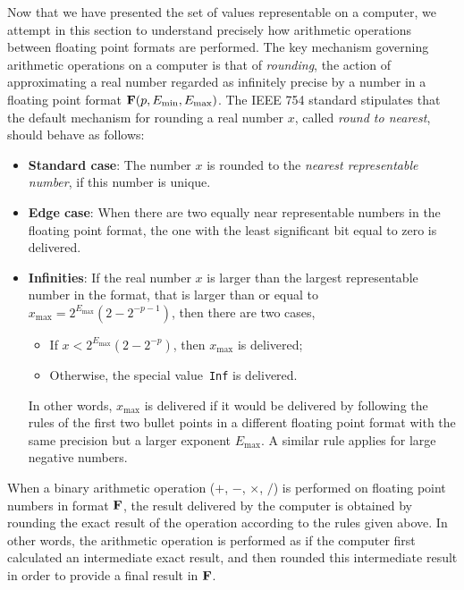Now that we have presented the set of values representable on a computer,
we attempt in this section to understand precisely how arithmetic operations between floating point formats are performed.
The key mechanism governing arithmetic operations on a computer is that of \emph{rounding},
the action of approximating a real number regarded as infinitely precise by a number in a floating point format $\mathbf F (p, E_{\min}, E_{\max})$.
The IEEE 754 standard stipulates that the default mechanism for rounding a real number $x$,
called \emph{round to nearest},
should behave as follows:
\begin{itemize}
    \item
        \textbf{Standard case}:
        The number $x$ is rounded to the \emph{nearest representable number},
        if this number is unique.
    \item
        \textbf{Edge case}:
        When there are two equally near representable numbers in the floating point format,
        the one with the least significant bit equal to zero is delivered.
    \item
        \textbf{Infinities}:
        If the real number $x$ is larger than the largest representable number in the format,
        that is larger than or equal to $x_{\max} = 2^{E_{\max}} (2 - 2^{-p-1})$,
        then there are two cases,
        \begin{itemize}
            \item If $x < 2^{E_{\max}} (2 - 2^{-p})$, then $x_{\max}$ is delivered;
            \item Otherwise, the special value~\texttt{Inf} is delivered.
        \end{itemize}
        In other words, $x_{\max}$ is delivered if it would be delivered by following the rules of the first two bullet points
        in a different floating point format with the same precision but a larger exponent $E_{\max}$.
        A similar rule applies for large negative numbers.
\end{itemize}

When a binary arithmetic operation ($+$, $-$, $\times$, $/$) is performed on floating point numbers in format $\mathbf F$,
the result delivered by the computer is obtained by rounding the exact result of the operation according to the rules given above.
In other words,
the arithmetic operation is performed as if the computer first calculated an intermediate exact result,
and then rounded this intermediate result in order to provide a final result in $\mathbf F$.

